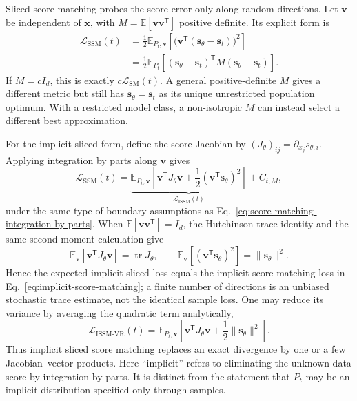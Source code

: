 \documentclass[11pt]{article}
\newcommand{\vct}[1]{\bm{#1}}
\begin{document}
Sliced score matching probes the score error only along random directions.
Let \(\vct{v}\) be independent of \(\vct{x}\), with
\(M=\mathbb{E}[\vct{v}\vct{v}^{\mathsf{T}}]\) positive definite. Its explicit
form is
\begin{align}
    \mathcal{L}_{\mathrm{SSM}}(t)
    &=\frac{1}{2}\mathbb{E}_{P_t,\vct{v}}\!\left[
      \bigl(\vct{v}^{\mathsf{T}}
      (\vct{s}_{\theta}-\vct{s}_t)\bigr)^2\right]
    \nonumber\\
    &=\frac{1}{2}\mathbb{E}_{P_t}\!\left[
      (\vct{s}_{\theta}-\vct{s}_t)^{\mathsf{T}}
      M(\vct{s}_{\theta}-\vct{s}_t)\right].
    \label{eq:explicit-sliced-score-matching}
\end{align}
If \(M=cI_d\), this is exactly \(c\mathcal{L}_{\mathrm{SM}}(t)\). A general
positive-definite \(M\) gives a different metric but still has
\(\vct{s}_{\theta}=\vct{s}_t\) as its unique unrestricted population optimum.
With a restricted model class, a non-isotropic \(M\) can instead select a
different best approximation.

For the implicit sliced form, define the score Jacobian by
\((J_{\theta})_{ij}=\partial_{x_j}s_{\theta,i}\). Applying integration by parts
along \(\vct{v}\) gives
\begin{equation}
    \mathcal{L}_{\mathrm{SSM}}(t)
    =\underbrace{\mathbb{E}_{P_t,\vct{v}}\!\left[
      \vct{v}^{\mathsf{T}}J_{\theta}\vct{v}
      +\frac{1}{2}(\vct{v}^{\mathsf{T}}\vct{s}_{\theta})^2
      \right]}_{\mathcal{L}_{\mathrm{ISSM}}(t)}+C_{t,M},
    \label{eq:implicit-sliced-score-matching}
\end{equation}
under the same type of boundary assumptions as
Eq.~\eqref{eq:score-matching-integration-by-parts}. When
\(\mathbb{E}[\vct{v}\vct{v}^{\mathsf{T}}]=I_d\), the Hutchinson trace
identity and the same second-moment calculation give~\cite{hutchinson1990}
\begin{equation}
    \mathbb{E}_{\vct{v}}[\vct{v}^{\mathsf{T}}J_{\theta}\vct{v}]
    =\operatorname{tr}J_{\theta},
    \qquad
    \mathbb{E}_{\vct{v}}
      [(\vct{v}^{\mathsf{T}}\vct{s}_{\theta})^2]
    =\lVert\vct{s}_{\theta}\rVert^2.
    \label{eq:sliced-hutchinson-identities}
\end{equation}
Hence the expected implicit sliced loss equals the implicit score-matching
loss in Eq.~\eqref{eq:implicit-score-matching}; a finite number of directions
is an unbiased stochastic trace estimate, not the identical sample loss. One
may reduce its variance by averaging the quadratic term analytically,
\begin{equation}
    \mathcal{L}_{\mathrm{ISSM\text{-}VR}}(t)
    =\mathbb{E}_{P_t,\vct{v}}\!\left[
      \vct{v}^{\mathsf{T}}J_{\theta}\vct{v}
      +\frac{1}{2}\lVert\vct{s}_{\theta}\rVert^2\right].
    \label{eq:variance-reduced-implicit-sliced-score-matching}
\end{equation}
Thus implicit sliced score matching replaces an exact divergence by one or a
few Jacobian--vector products. Here ``implicit'' refers to eliminating the
unknown data score by integration by parts. It is distinct from the statement
that \(P_t\) may be an implicit distribution specified only through samples.
\end{document}
